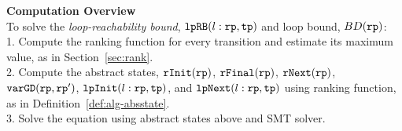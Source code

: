 \textbf{Computation Overview}
\\
  To solve the \emph{loop-reachability bound}, $\mathtt{lpRB}(l: \mathtt{rp}, \mathtt{tp})$ and loop bound, $BD(\mathtt{rp})$:
  \\
  1. Compute the ranking function for every transition and estimate its maximum value, as in Section~\ref{sec:rank}.
  \\
  2. Compute the abstract states,
  $\mathtt{rInit}(\mathtt{rp})$, $\mathtt{rFinal}(\mathtt{rp})$, $\mathtt{rNext}(\mathtt{rp})$, $\mathtt{varGD}(\mathtt{rp}, \mathtt{rp}')$, 
  $\mathtt{lpInit}(l: \mathtt{rp}, \mathtt{tp})$, and $\mathtt{lpNext}(l: \mathtt{rp}, \mathtt{tp})$ using ranking function,
  as in Definition~\ref{def:alg-absstate}.
  \\
  3. Solve the equation using abstract states above and SMT solver.
